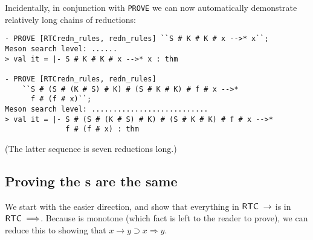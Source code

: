 \documentclass[12pt]{article}
\begin{document}
Incidentally, in conjunction with \texttt{PROVE} we can now
automatically demonstrate relatively long chains of reductions:
\begin{session}\begin{verbatim}
- PROVE [RTCredn_rules, redn_rules] ``S # K # K # x -->* x``;
Meson search level: ......
> val it = |- S # K # K # x -->* x : thm

- PROVE [RTCredn_rules, redn_rules]
    ``S # (S # (K # S) # K) # (S # K # K) # f # x -->*
      f # (f # x)``;
Meson search level: ...........................
> val it = |- S # (S # (K # S) # K) # (S # K # K) # f # x -->*
              f # (f # x) : thm
\end{verbatim}\end{session}
(The latter sequence is seven reductions long.)


\subsection{Proving the s are the same}
\label{sec:Proving-RTCs-same}

We start with the easier direction, and show that everything in
${\sf RTC}\;\rightarrow$ is in ${\sf RTC}\;\Longrightarrow$.  Because
 is monotone (which fact is left to the reader to prove),
we can reduce this to showing that $x\rightarrow y\supset
x\Longrightarrow y$.
\end{document}
